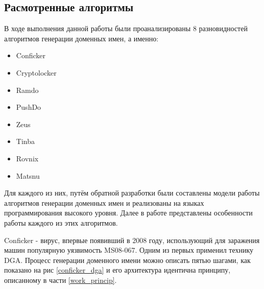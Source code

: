     \subsection{Расмотренные алгоритмы}
    В ходе выполнения данной работы были проанализированы 8 разновидностей алгоритмов генерации доменных имен, а именно:
    \begin{itemize}
        \item Conficker
        \item Cryptolocker
        \item Ramdo
        \item PushDo
        \item Zeus
        \item Tinba
        \item Rovnix
        \item Matsnu
    \end{itemize}
    Для каждого из них, путём обратной разработки были составлены модели работы алгоритмов генерации доменных имен и реализованы на языках программирования высокого уровня. Далее в работе представлены особенности работы каждого из этих алгоритмов.

Conficker - вирус, впервые появивший в 2008 году, использующий для заражения машин популярную уязвимость MS08-067. Одним из первых применил технику DGA. Процесс генерации доменного имени можно описать пятью шагами, как показано на рис \ref{conficker_dga} и его архитектура идентична принципу, описанному в части \ref{work_princip}.

